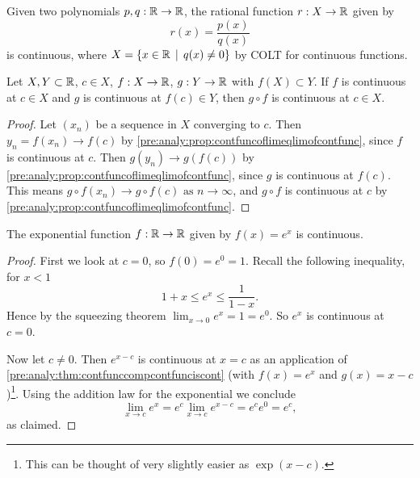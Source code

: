 \documentclass[10pt, a4paper]{article}
\newcommand{\limas}[3][n]{#2 \rightarrow #3 \text{ as } #1 \rightarrow \infty}
\begin{document}
\begin{example}
    Given two polynomials $p, q : \mathbb{R} \rightarrow \mathbb{R}$,
    the rational function $r : X \rightarrow \mathbb{R}$ given by
    \[
    r(x) = \frac{p(x)}{q(x)}
    \]
    is continuous,
    where $X = \{x \in \mathbb{R}\,\mid\,q(x) \neq 0\}$ by COLT for continuous functions.
\end{example}

\begin{theorem}\label{pre:analy:thm:contfunccompcontfunciscont}
    Let $X, Y \subset \mathbb{R}$,
    $c \in X$,
    $f : X \rightarrow \mathbb{R}$,
    $g : Y \rightarrow \mathbb{R}$ with $f(X) \subset Y$.
    If $f$ is continuous at $c \in X$ and $g$ is continuous at $f(c) \in Y$,
    then $g \circ f$ is continuous at $c \in X$.

    \begin{proof}
        Let $(x_n)$ be a sequence in $X$ converging to $c$.
        Then $y_n = f(x_n) \rightarrow f(c)$ by \autoref{pre:analy:prop:contfuncoflimeqlimofcontfunc},
        since $f$ is continuous at $c$.
        Then $g(y_n) \rightarrow g(f(c))$ by \autoref{pre:analy:prop:contfuncoflimeqlimofcontfunc},
        since $g$ is continuous at $f(c)$.
        This means $\limas{g \circ f(x_n)}{g \circ f(c)}$,
        and $g \circ f$ is continuous at $c$ by \autoref{pre:analy:prop:contfuncoflimeqlimofcontfunc}.
    \end{proof}
\end{theorem}

\begin{example}
    The exponential function $f : \mathbb{R} \rightarrow \mathbb{R}$ given by $f(x) = e ^ x$ is continuous.
    \begin{proof}
        First we look at $c = 0$,
        so $f(0) = e ^ 0 = 1$.
        Recall the following inequality,
        for $x < 1$
        \[
        1 + x \leq e ^ x \leq \frac{1}{1 - x}.
        \]
        Hence by the squeezing theorem $\lim_{x \rightarrow 0}e ^ x = 1 = e ^ 0$.
        So $e ^ x$ is continuous at $c = 0$.

        Now let $c \neq 0$.
        Then $e ^ {x - c}$ is continuous at $x = c$ as an application of \autoref{pre:analy:thm:contfunccompcontfunciscont}
        (with $f(x) = e ^ x$ and $g(x) = x - c$)\footnote{This can be thought of very slightly easier as $\exp{(x - c)}$.}.
        Using the addition law for the exponential we conclude
        \[
        \lim_{x \rightarrow c}e ^ x = e ^ c \lim_{x \rightarrow c}e ^ {x - c} = e ^ ce ^ 0 = e ^ c,
        \]
        as claimed.
    \end{proof}
\end{example}
\end{document}
